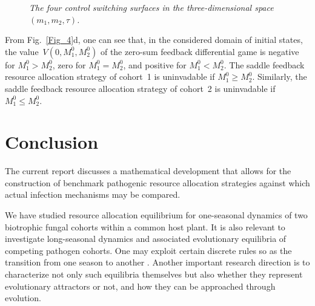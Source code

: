 \documentclass[a4paper,12pt]{article}
\begin{document}
\begin{figure}
\bf \caption{\it The four control switching surfaces in the three-dimensional space~$ (m_1, m_2, \tau) $.}
\label{Fig_7}
\end{figure}

From Fig.~{\rm \ref{Fig_4}d,} one can see that{\rm ,} in the considered domain of initial states{\rm ,}
the value~$ V \left( 0, M_1^0, M_2^0 \right) $ of the zero-sum feedback differential game is negative for
$ M_1^0 > M_2^0 ${\rm ,} zero for $ M_1^0 = M_2^0 ${\rm ,} and positive for $ M_1^0 < M_2^0 $. The saddle feedback
resource allocation strategy of cohort~{\rm 1} is uninvadable if $ M_1^0 \geqslant M_2^0 $. Similarly{\rm ,}
the saddle feedback resource allocation strategy of cohort~{\rm 2} is uninvadable if $ M_1^0 \leqslant M_2^0 $.


\section{Conclusion}

The current report discusses a mathematical development that allows for the construction of benchmark pathogenic resource
allocation strategies against which actual infection mechanisms may be compared.

We have studied resource allocation equilibrium for one-seasonal dynamics of two biotrophic fungal cohorts within a common host
plant. It is also relevant to investigate long-seasonal dynamics and associated evolutionary equilibria of competing pathogen
cohorts. One may exploit certain discrete rules so as the transition from one season to another \cite{MailleretLemesle2009,Akhmetzhanov2012}.
Another important research direction is to characterize not only such equilibria themselves but also whether they represent evolutionary
attractors or not, and how they can be approached through evolution.
\end{document}
